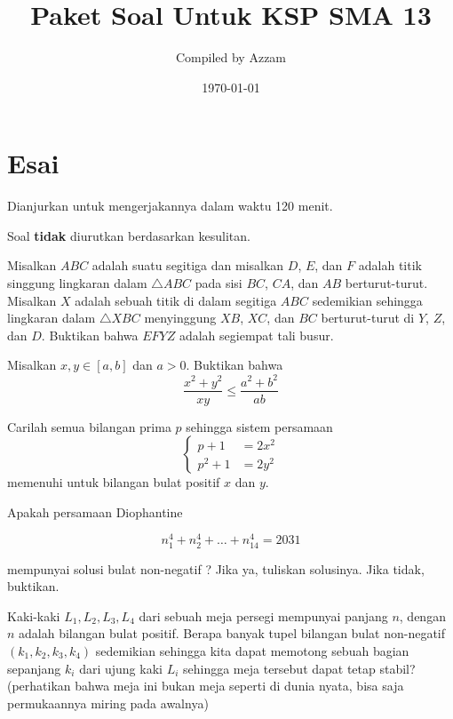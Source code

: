 \documentclass[11pt]{scrartcl}
\begin{document}
	\title{Paket Soal Untuk KSP SMA 13} %
	\date{\today}
	\author{Compiled by Azzam}
	\maketitle
	

	\section{Esai}
	Dianjurkan untuk mengerjakannya dalam waktu 120 menit.
	
	Soal \textbf{tidak} diurutkan berdasarkan kesulitan. 
	
	\begin{soalbaru}
	Misalkan $ABC$ adalah suatu segitiga dan misalkan $D$, $E$, dan $F$ adalah titik singgung lingkaran dalam $\triangle ABC$ pada sisi $BC$, $CA$, dan $AB$ berturut-turut. Misalkan $X$ adalah sebuah titik di dalam segitiga $ABC$ sedemikian sehingga lingkaran dalam $\triangle XBC$ menyinggung $XB$, $XC$, dan $BC$ berturut-turut di $Y$, $Z$, dan $D$. Buktikan bahwa $EFYZ$ adalah segiempat tali busur.
	\end{soalbaru}
	
	
	
	\begin{soalbaru}
	Misalkan $x,y \in [a,b]$ dan $a>0$. Buktikan bahwa $$\dfrac{x^2+y^2}{xy} \le \dfrac{a^2+b^2}{ab}$$
	\end{soalbaru}
	
	
	
	\begin{soalbaru}
	Carilah semua bilangan prima $p$ sehingga sistem persamaan
	$$\begin{cases}
	p+1 &=  2x^2\\
	p^2 + 1 &= 2y^2
	\end{cases}$$
	memenuhi untuk bilangan bulat positif $x$ dan $y$.
	\end{soalbaru}
	
	\begin{soalbaru}
	Apakah persamaan Diophantine

	$$n_{1}^4+n_{2}^4+\dots+n_{14}^4 = 2031$$

	mempunyai solusi bulat non-negatif ? Jika ya, tuliskan solusinya. Jika tidak, buktikan.
	\end{soalbaru}
	
	\newpage
	\begin{soalbaru}
	Kaki-kaki $L_1,L_2,L_3,L_4$ dari sebuah meja persegi mempunyai panjang $n$, dengan $n$ adalah bilangan bulat positif. Berapa banyak tupel bilangan bulat non-negatif $(k_1,k_2,k_3,k_4)$ sedemikian sehingga kita dapat memotong sebuah bagian sepanjang $k_i$ dari ujung kaki $L_i$ sehingga meja tersebut dapat tetap stabil? (perhatikan bahwa meja ini bukan meja seperti di dunia nyata, bisa saja permukaannya miring pada awalnya)
	\end{soalbaru}
	
	
\end{document}
